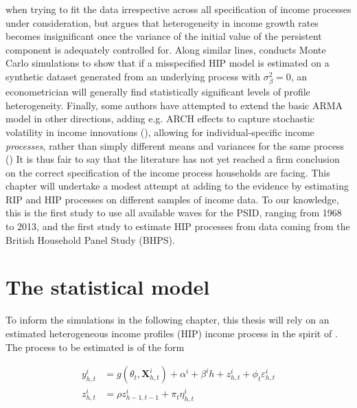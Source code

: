 when trying to fit the data irrespective across all specification of income 
processes under consideration, but argues that heterogeneity in income growth
rates becomes insignificant once the variance of the initial value of the 
persistent component is adequately controlled for. Along similar lines, \citet{Hryshko2012} 
conducts Monte Carlo simulations to show that if a misspecified HIP model is 
estimated on a synthetic dataset generated from an underlying process with
$\sigma^2_{\beta}=0$, an econometrician will generally find statistically 
significant levels of profile heterogeneity. 
Finally, some authors have attempted to extend the basic ARMA model in other 
directions, adding e.g. ARCH effects to capture stochastic volatility in income
innovations (\citealt{MeghirPistaferri2004}), allowing for individual-specific
income \textit{processes}, rather than simply different means and variances for 
the same process (\citealt{BrowningEjrnaesAlvarez2010})
It is thus fair to say that the literature has not yet reached a firm conclusion 
on the correct specification of the income process households are facing. This 
chapter will undertake a modest attempt at adding to the evidence by estimating
RIP and HIP processes on different samples of income data. To our knowledge, 
this is the first study to use all available waves for the PSID, ranging from 
1968 to 2013, and the first study to estimate HIP processes from data coming
from the British Household Panel Study (BHPS).

\section{The statistical model}
To inform the simulations in the following chapter, this thesis will rely on an
estimated heterogeneous income profiles (HIP) income process in the spirit of
\citet{Guvenen2009}. The process to be estimated is of the form

\begin{align}
y_{h,t}^i &= g(\theta_t, \pmb{X}_{h,t}^i) + \alpha^i + \beta^i h + z_{h,t}^i + \phi_t \varepsilon_{h,t}^i \label{incproc} \\
z_{h,t}^i &= \rho z_{h-1,t-1}^i + \pi_t \eta_{h,t}^i \label{persshock}
\end{align}

